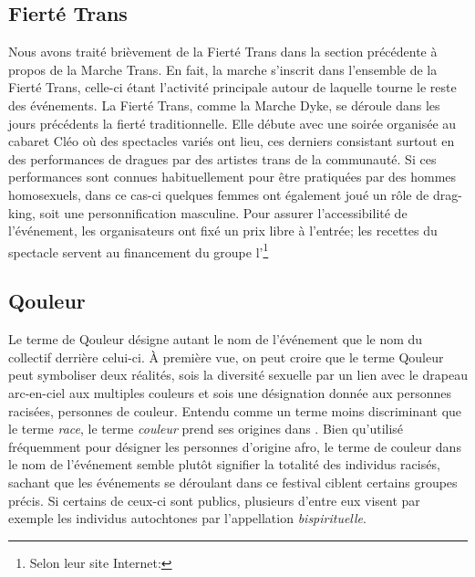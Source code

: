 \subsection{Fierté Trans}
\label{subsec:fiertetrans}
Nous avons traité brièvement de la Fierté Trans dans la section précédente à propos de la Marche Trans.
En fait, la marche s'inscrit dans l'ensemble de la Fierté Trans, celle-ci étant l'activité principale autour de laquelle tourne le reste des événements.
La Fierté Trans, comme la Marche Dyke, se déroule dans les jours précédents la fierté traditionnelle.
Elle débute avec une soirée organisée au cabaret Cléo où des spectacles variés ont lieu, ces derniers consistant surtout en des performances de dragues par des artistes trans de la communauté.
Si ces performances sont connues habituellement pour être pratiquées par des hommes homosexuels, dans ce cas-ci quelques femmes ont également joué un rôle de drag-king, soit une personnification masculine.
Pour assurer l'accessibilité de l'événement, les organisateurs ont fixé un prix libre à l'entrée; les recettes du spectacle servent au financement du groupe l'\astteq{}\footnote{Selon leur site Internet: }

\subsection{Qouleur}
\label{subsec:qouleur}
Le terme de Qouleur désigne autant le nom de l'événement que le nom du collectif derrière celui-ci.
À première vue, on peut croire que le terme Qouleur peut symboliser deux réalités, sois la diversité sexuelle par un lien avec le drapeau arc-en-ciel aux multiples couleurs et sois une désignation donnée aux personnes racisées, personnes de couleur.
Entendu comme un terme moins discriminant que le terme \emph{race}, le terme \emph{couleur} prend ses origines dans .
Bien qu'utilisé fréquemment pour désigner les personnes d'origine afro, le terme de couleur dans le nom de l'événement semble plutôt signifier la totalité des individus racisés, sachant que les événements se déroulant dans ce festival ciblent certains groupes précis.
Si certains de ceux-ci sont publics, plusieurs d'entre eux visent par exemple les individus autochtones par l'appellation  \emph{bispirituelle}.

